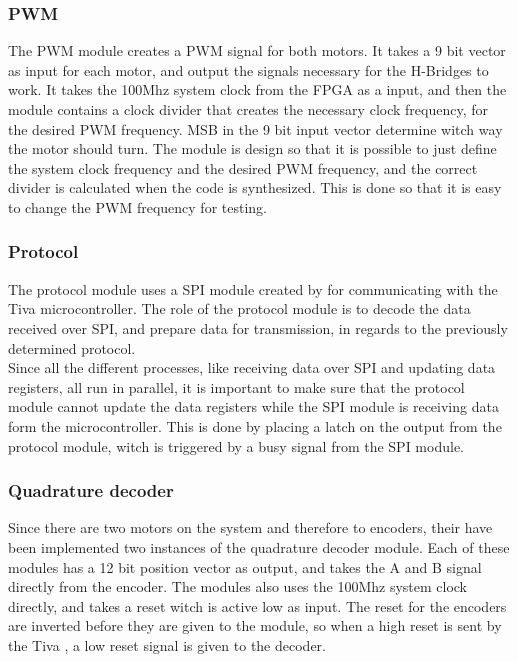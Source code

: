 \documentclass[../../../main]{subfiles}
\begin{document}
\subsubsection{PWM}
The PWM module creates a PWM signal for both motors. It takes a 9 bit vector as input for each motor, and output the signals necessary for the H-Bridges to work.
It takes the 100Mhz system clock from the FPGA as a input, and then the module contains a clock divider that creates the necessary clock frequency, for the desired PWM frequency. 
MSB in the 9 bit input vector determine witch way the motor should turn.
The module is design so  that it is possible to just  define the system clock frequency and the desired PWM frequency, and the correct divider is calculated when the code is synthesized.
This is done so that it is easy to change the PWM frequency for testing.
\subsubsection{Protocol}
The protocol module uses a SPI module created by  for communicating with the Tiva microcontroller. 
The role of the protocol module is to decode the data received over SPI, and prepare data for transmission, in regards to the previously determined protocol.
\\
Since all the different processes, like receiving data over SPI and updating data registers, all run in parallel, it is important to make sure that the protocol module cannot update the data registers while the SPI module is receiving data form the microcontroller.
This is done by placing a latch on the output from the protocol module, witch is triggered by a busy signal from the SPI module.

\subsubsection{Quadrature decoder}
\label{subsubsec:Qdecoder_implement}
Since there are two motors on the system and therefore to encoders, their have been implemented two instances of the quadrature decoder module.
Each of these modules has a 12 bit position vector as output, and takes the  A and B signal directly from the encoder. The modules also uses the 100Mhz system clock directly, and takes a reset witch  is active low as input.
The reset for the encoders are inverted before they are given to the module, so when a high reset is sent by the Tiva , a low reset signal is given to the decoder.
\end{document}
